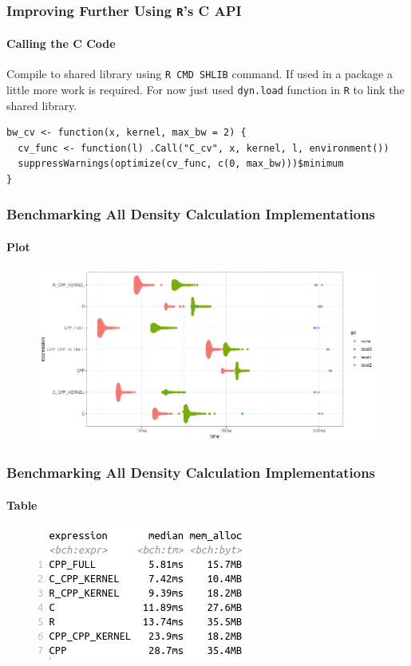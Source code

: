 \documentclass[aspectratio=169]{beamer}
\begin{document}
\begin{frame}[fragile]
  \frametitle{Improving Further Using \texttt{R}'s C API}  
  \framesubtitle{Calling the C Code}
  Compile to shared library using \texttt{R CMD SHLIB} command. If used in a package a little more work is required. For now just used \texttt{dyn.load} function in \texttt{R} to link the shared library.\\

\begin{verbatim}
bw_cv <- function(x, kernel, max_bw = 2) {
  cv_func <- function(l) .Call("C_cv", x, kernel, l, environment())
  suppressWarnings(optimize(cv_func, c(0, max_bw)))$minimum
}
\end{verbatim}
\end{frame}
\begin{frame}
  \frametitle{Benchmarking All Density Calculation Implementations}
  \framesubtitle{Plot}
  \begin{figure}
    \centering
    \includegraphics[scale = 0.5]{figure/CVsRcppDensity.png}
  \end{figure}
\end{frame}
\begin{frame}
  \frametitle{Benchmarking All Density Calculation Implementations}
  \framesubtitle{Table}
  \begin{figure}
    \centering
    \includegraphics[scale = 0.7]{figure/CvsRCPPvsR_dens.png}
  \end{figure}
\end{frame}
\end{document}

